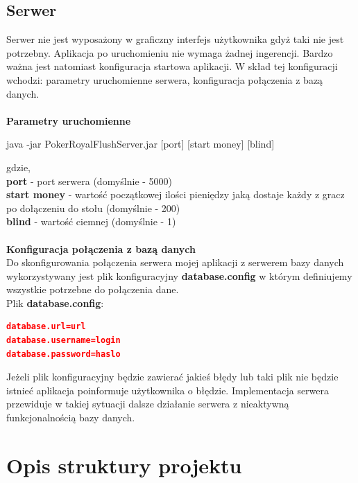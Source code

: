 \documentclass{article}
\begin{document}
    \subsection{Serwer}
        Serwer nie jest wyposażony w graficzny interfejs użytkownika gdyż taki nie jest potrzebny.
        Aplikacja po uruchomieniu nie wymaga żadnej ingerencji.
        Bardzo ważna jest natomiast konfiguracja startowa aplikacji.
        W skład tej konfiguracji wchodzi: parametry uruchomienne serwera, konfiguracja połączenia z bazą danych.\\
        \\
        \textbf{Parametry uruchomienne}
            \begin{center}
                java -jar PokerRoyalFlushServer.jar [port] [start money] [blind]
            \end{center}
            gdzie,\\
            \textbf{port} - port serwera (domyślnie - 5000)\\
            \textbf{start money} - wartość początkowej ilości pieniędzy jaką dostaje każdy z gracz po dołączeniu do stołu (domyślnie - 200)\\
            \textbf{blind} - wartość ciemnej (domyślnie - 1)\\
        \\
        \textbf{Konfiguracja połączenia z bazą danych}\\
            Do skonfigurowania połączenia serwera mojej aplikacji z serwerem bazy danych wykorzystywany jest plik konfiguracyjny \textbf{database.config} w którym definiujemy wszystkie potrzebne do połączenia dane.\\
            Plik \textbf{database.config}:
            
            \begin{lstlisting}[language=json, firstnumber=1]
database.url=url
database.username=login
database.password=haslo
            \end{lstlisting}
            \vspace{2mm}
            
            Jeżeli plik konfiguracyjny będzie zawierać jakieś błędy lub taki plik nie będzie istnieć aplikacja poinformuje użytkownika o błędzie.
            Implementacja serwera przewiduje w takiej sytuacji dalsze działanie serwera z nieaktywną funkcjonalnością bazy danych.
        

\section{Opis struktury projektu}
\end{document}
